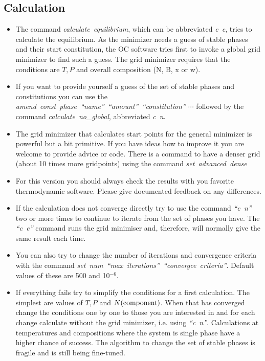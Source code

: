 \documentclass[12pt]{article}
\begin{document}
\subsection{Calculation}

\begin{itemize}
\item The command {\em calculate~equilibrium}, which can be
  abbreviated {\em c~e}, tries to calculate the equilibrium.  As the
  minimizer needs a guess of stable phases and their start
  constitution, the OC software tries first to invoke a global grid
  minimizer to find such a guess.  The grid minimizer requires that
  the conditions are $T, P$ and overall composition (N, B, x or w).

\item If you want to provide yourself a guess of the set of stable
  phases and constitutions you can use the {\em
    amend~const~phase~``name''~``amount''~``constitution'' $\cdots$}
  followed by the command {\em calculate~no\_global}, abbreviated {\em
    c~n}.

\item The grid minimizer that calculates start points for the general
  minimizer is powerful but a bit primitive.  If you have ideas how to
  improve it you are welcome to provide advice or code.  There is
  a command to have a denser grid (about 10 times more gridpoints) using
  the command {\em set~advanced~dense}

\item For this version you should always check the results with you
  favorite thermodynamic software.  Please give documented feedback
  on any differences.

\item If the calculation does not converge directly try to use the
  command {\em ``c~n''} two or more times to continue to iterate from
  the set of phases you have.  The {\em ``c~e''} command runs the grid
  minimiser and, therefore, will normally give the same result each
  time.

\item You can also try to change the number of iterations and
  convergence criteria with the command {\em
    set~num~``max~iterations''~``convergce~criteria''}.  Default
  values of these are 500 and 10$^{-6}$.

\item If everything fails try to simplify the conditions for a first
  calculation.  The simplest are values of $T, P$ and $N(\rm
  component)$. When that has converged change the conditions one by
  one to those you are interested in and for each change calculate
  without the grid minimizer, i.e.  using {\em ``c~n''}.  Calculations
  at temperatures and compositions where the system is single phase
  have a higher chance of success.  The algorithm to change the set of
  stable phases is fragile and is still being fine-tuned.


\end{itemize}
\end{document}
